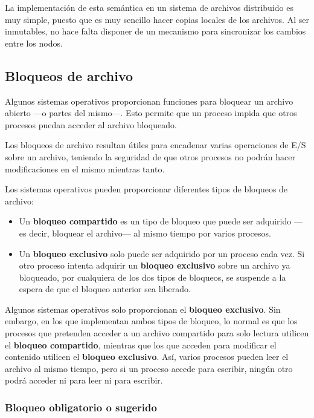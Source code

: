 La implementación de esta semántica en un sistema de archivos
distribuido es muy simple, puesto que es muy sencillo hacer copias
locales de los archivos. Al ser inmutables, no hace falta disponer de un
mecanismo para sincronizar los cambios entre los nodos.

\subsection{Bloqueos de archivo}\label{_bloqueos_de_archivo}

Algunos sistemas operativos proporcionan funciones para bloquear un
archivo abierto ---o partes del mismo---. Esto permite que un proceso
impida que otros procesos puedan acceder al archivo bloqueado.

Los bloqueos de archivo resultan útiles para encadenar varias
operaciones de E/S sobre un archivo, teniendo la seguridad de que otros
procesos no podrán hacer modificaciones en el mismo mientras tanto.

Los sistemas operativos pueden proporcionar diferentes tipos de bloqueos
de archivo:

\begin{itemize}
\item
  Un \textbf{bloqueo compartido}{} es un tipo de bloqueo que puede ser
  adquirido ---es decir, bloquear el archivo--- al mismo tiempo por
  varios procesos.
\item
  Un \textbf{bloqueo exclusivo}{} solo puede ser adquirido por un
  proceso cada vez. Si otro proceso intenta adquirir un \textbf{bloqueo
  exclusivo} sobre un archivo ya bloqueado, por cualquiera de los dos
  tipos de bloqueos, se suspende a la espera de que el bloqueo anterior
  sea liberado.
\end{itemize}

Algunos sistemas operativos solo proporcionan el \textbf{bloqueo
exclusivo}. Sin embargo, en los que implementan ambos tipos de bloqueo,
lo normal es que los procesos que pretenden acceder a un archivo
compartido para solo lectura utilicen el \textbf{bloqueo compartido},
mientras que los que acceden para modificar el contenido utilicen el
\textbf{bloqueo exclusivo}. Así, varios procesos pueden leer el archivo
al mismo tiempo, pero si un proceso accede para escribir, ningún otro
podrá acceder ni para leer ni para escribir.

\subsubsection{Bloqueo obligatorio o
sugerido}\label{_bloqueo_obligatorio_o_sugerido}

